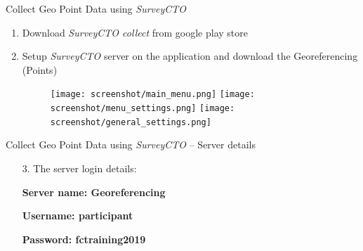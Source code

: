 \documentclass[aspectratio=169]{beamer}
\begin{document}
\begin{frame}{Collect Geo Point Data using \textit{SurveyCTO}}
   
    \begin{enumerate}
        \item Download \textit{SurveyCTO collect} from  google play store
    
        \item Setup \textit{SurveyCTO} server on the application and download the Georeferencing (Points)
    
        \begin{center}
            
            \begin{figure}[!htb]
                \texttt{[image: screenshot/main\_menu.png]}
                \endminipage \hspace{1cm}
                \texttt{[image: screenshot/menu\_settings.png]}
                \endminipage \hspace{1cm}
                \texttt{[image: screenshot/general\_settings.png]}
                \endminipage
                \label{fig:screenshots}
            \end{figure}
            \FloatBarrier      
        \end{center}        
            
    \end{enumerate}


\end{frame}




\begin{frame}{Collect Geo Point Data using \textit{SurveyCTO} -- Server details}
   

        \begin{itemize}
            \item[3.] The server login details: \par
            \vspace{0.2cm}
            \bf{Server name:} Georeferencing \par
            \bf{Username:} participant \par
            \bf{Password:} fctraining2019 \par
        \end{itemize} 
    
\end{frame}
\end{document}
